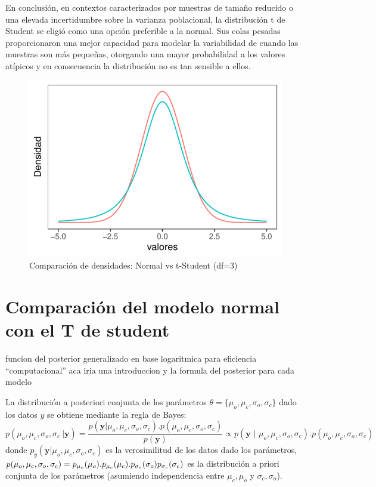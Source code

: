 \documentclass[
]{article}
\begin{document}
En conclusión, en contextos caracterizados por muestras de tamaño reducido o una elevada incertidumbre sobre la varianza poblacional, la distribución t de Student se eligió como una opción preferible a la normal. Sus colas pesadas proporcionaron una mejor capacidad para modelar la variabilidad de cuando las muestras son más pequeñas, otorgando una mayor probabilidad a los valores atípicos y en consecuencia la distribución no es tan sensible a ellos.

\begin{figure}

{\centering \includegraphics{TP-2---El-Dibu-de-la-vida_files/figure-latex/f18-1} 

}

\caption{Comparación de densidades: Normal vs t-Student (df=3)}\label{fig:f18}
\end{figure}

\newpage

\section{Comparación del modelo normal con el T de student}\label{comparaciuxf3n-del-modelo-normal-con-el-t-de-student}

funcion del posterior generalizado en base logaritmica para eficiencia ``computacional''
aca iria una introduccion y la formula del posterior para cada modelo

La distribución a posteriori conjunta de los parámetros \(\theta = \{\mu_o,\mu_c, \sigma_o, \sigma_c\}\) dado los datos \(y\) se obtiene mediante la regla de Bayes:
\[p(\mu_o,\mu_c, \sigma_o, \sigma_c\ | \boldsymbol{y}) = \frac{p(\boldsymbol{y} | \mu_o,\mu_c, \sigma_o, \sigma_c). p(\mu_o,\mu_c, \sigma_o, \sigma_c)}{p(\boldsymbol{y})} \propto p( \boldsymbol{y}  \text{ | } \mu_o,\mu_c, \sigma_o, \sigma_c).p(\mu_o,\mu_c, \sigma_o, \sigma_c)\]
donde \(p_y(\boldsymbol{y} | \mu_o,\mu_c, \sigma_o, \sigma_c)\) es la verosimilitud de los datos dado los parámetros, \(\\ p(\mu_o,\mu_c, \sigma_o, \sigma_c) = p_{\mu_o}(\mu_o).p_{\mu_c}(\mu_c).p_{\sigma_o}(\sigma_o) p_{\sigma_c}(\sigma_c)\) es la distribución a priori conjunta de los parámetros (asumiendo independencia entre \(\mu_c , \mu_o\) y \(\sigma_c , \sigma_o\)).
\end{document}
